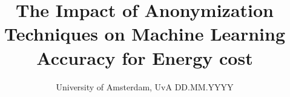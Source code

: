 \documentclass[ds]{mscthesis}
\title{The Impact of Anonymization Techniques on Machine Learning Accuracy for Energy cost}
\date{University of Amsterdam, UvA DD.MM.YYYY}
\begin{document}
\pagestyle{plain}
\setcounter{page}{0}

\maketitlepage
\fixemptypage

\begin{abstract}
\end{abstract}

\maketitle




 

%
%




\newpage

\end{document}
